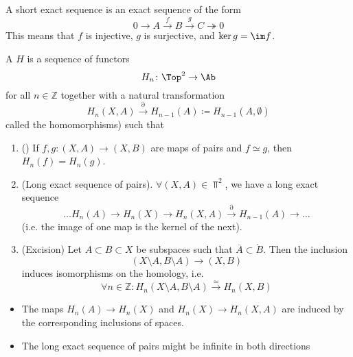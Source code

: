\begin{comment}
\begin{trivial*}
    Note that the last property used is just that injective maps of spaces are monic in $\Top$ (which is trivial). 
\end{trivial*}
\end{comment}

\begin{aside}
    A short exact sequence is an exact sequence of the form
    \[
    0 \to  A \stackrel{f}{\longrightarrow} B \stackrel{g}{\longrightarrow} C \twoheadrightarrow 0
    \] 
    This means that $f$ is injective,  $g$ is surjective, and  $\ker g = \im f$.
\end{aside}

\begin{definition}\label{def:homology-theory}
    A  $H$ is a sequence of functors 
    \[
    H_n\colon \Top^2 \to  \Ab
    \]
    for all $n\in \mathbb{Z}$ together with a natural transformation
    \[
        H_n(X,A) \stackrel{\partial}{\longrightarrow} H_{n-1}(A) \coloneqq  H_{n-1}(A,\emptyset)
    \] 
    called the  homomorphisms) such that
    \begin{enumerate}[3)]
        \item () If $f,g\colon (X,A) \to  (X,B)$ are maps of pairs and $f\simeq g$, then  $H_n(f) = H_n(g)$.
        \item (Long exact sequence of pairs). $\forall (X,A) \in \Top^2$, we have a long exact sequence 
            \[
\ldots                H_n(A) \to H_n(X) \to H_n(X,A) \stackrel{\partial}{\longrightarrow} H_{n-1}(A) \to  \ldots
            \] 
            (i.e. the image of one map is the kernel of the next).
        \item (Excision) Let $A\subset B\subset X$ be subspaces such that $\overline{A}\subset \mathring{B}$. Then the inclusion
            \[
                (X \setminus A, B\setminus A) \to  (X,B)
            \] 
            induces isomorphisms on the homology, i.e.
            \[
  \forall n\in \mathbb{Z}\colon H_n(X \setminus A, B\setminus A) \stackrel{\simeq}{\longrightarrow}  H_n(X,B)
            \] 
    \end{enumerate}
\end{definition}

\begin{dremark}
    \begin{itemize}
        \item The maps $H_n(A) \to H_n(X) $ and $H_n(X) \to  H_n(X,A)$ are induced by the corresponding inclusions of spaces.
        \item The long exact sequence of pairs might be infinite in both directions
    \end{itemize}
\end{dremark}


